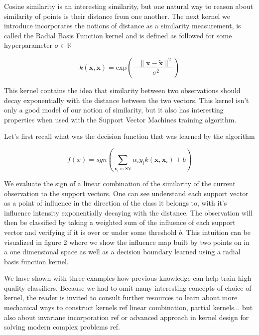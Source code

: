 Cosine similarity is an interesting similarity, but one natural way to reason about similarity of points is their distance from one another. The next kernel we introduce incorporates the notions of distance as a similarity measurement, is called the Radial Basis Function kernel and is defined as followed for some hyperparameter $\sigma \in \mathbb{R}$

\begin{equation*}
  k(\mathbf{x}, \mathbf{\tilde{x}}) = \text{exp}\left(-\frac{\|\mathbf{x} - \mathbf{\tilde{x}}\|^2}{\sigma^2}\right)
\end{equation*}

This kernel contains the idea that similarity between two observations should decay exponentially with the distance between the two vectors. This kernel isn't only a good model of our notion of similarity, but it also has interesting properties when used with the Support Vector Machines training algorithm.

Let's first recall what was the decision function that was learned by the algorithm

\begin{equation*}
  f\left(x\right) = sgn\left(\sum_{\mathbf{x}_i \text{ is SV}}\alpha_iy_ik\left(\mathbf{x}, \mathbf{x}_i\right) + b\right)
\end{equation*}

We evaluate the sign of a linear combination of the similarity of the current observation to the support vectors. One can see understand each support vector as a point of influence in the direction of the class it belongs to, with it's influence intensity exponentially decaying with the distance. The observation will then be classified by taking a weighted sum of the influence of each support vector and verifying if it is over or under some threshold $b$. This intuition can be visualized in figure 2 where we show the influence map built by two points on in a one dimensional space as well as a decision boundary learned using a radial basis function kernel.

We have shown with three examples how previous knowledge can help train high quality classifiers. Because we had to omit many interesting concepts of choice of kernel, the reader is invited to consult further resources to learn about more mechanical ways to construct kernels \textcolor[rgb]{1,0,0}{ref linear combination, partial kernels...} but also about invariane incorporation \textcolor[rgb]{1,0,0}{ref} or advanced approach in kernel design for solving modern complex problems \textcolor[rgb]{1,0,0}{ref}.

